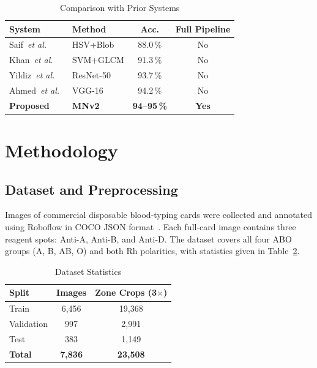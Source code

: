 \documentclass[conference]{IEEEtran}
\begin{document}
\begin{table}[htbp]
  \caption{Comparison with Prior Systems}
  \label{tab:comparison}
  \centering
  \renewcommand{\arraystretch}{1.1}
  \begin{tabular}{lp{1.5cm}cc}
    \toprule
    \textbf{System} & \textbf{Method} & \textbf{Acc.} & \textbf{Full Pipeline} \\
    \midrule
    Saif~\emph{et al.}~\cite{saif2016}    & HSV+Blob   & 88.0\,\% & No \\
    Khan~\emph{et al.}~\cite{khan2018}    & SVM+GLCM   & 91.3\,\% & No \\
    Yildiz~\emph{et al.}~\cite{yildiz2020}& ResNet-50  & 93.7\,\% & No \\
    Ahmed~\emph{et al.}~\cite{ahmed2021}  & VGG-16     & 94.2\,\% & No \\
    \textbf{Proposed}                     & \textbf{MNv2} & \textbf{94--95\,\%} & \textbf{Yes} \\
    \bottomrule
  \end{tabular}
\end{table}

\section{Methodology}

\subsection{Dataset and Preprocessing}

Images of commercial disposable blood-typing cards were collected
and annotated using Roboflow in COCO JSON format~\cite{lin2014coco}.
Each full-card image contains three reagent spots: Anti-A, Anti-B,
and Anti-D.
The dataset covers all four ABO groups (A, B, AB, O) and both Rh
polarities, with statistics given in Table~\ref{tab:dataset}.

\begin{table}[htbp]
  \caption{Dataset Statistics}
  \label{tab:dataset}
  \centering
  \begin{tabular}{lcc}
    \toprule
    \textbf{Split} & \textbf{Images} & \textbf{Zone Crops (3$\times$)} \\
    \midrule
    Train      & 6,456 & 19,368 \\
    Validation & 997   & 2,991  \\
    Test       & 383   & 1,149  \\
    \midrule
    \textbf{Total} & \textbf{7,836} & \textbf{23,508} \\
    \bottomrule
  \end{tabular}
\end{table}
\end{document}
